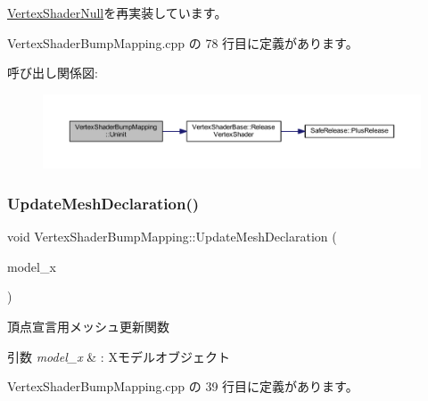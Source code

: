 \mbox{\hyperlink{class_vertex_shader_null_a16334df4ac02db3dd63f042622032301}{Vertex\+Shader\+Null}}を再実装しています。



 Vertex\+Shader\+Bump\+Mapping.\+cpp の 78 行目に定義があります。

呼び出し関係図\+:\nopagebreak
\begin{figure}[H]
\begin{center}
\leavevmode
\includegraphics[width=350pt]{class_vertex_shader_bump_mapping_abed4e0aa9655fa7a7a21e03d00e7c0e5_cgraph}
\end{center}
\end{figure}
\mbox{\label{class_vertex_shader_bump_mapping_a659d50e57533b9cd0204fc169985f1e0}} 
\subsubsection{\texorpdfstring{Update\+Mesh\+Declaration()}{UpdateMeshDeclaration()}}
{\footnotesize\ttfamily void Vertex\+Shader\+Bump\+Mapping\+::\+Update\+Mesh\+Declaration (\begin{DoxyParamCaption}\item[{\mbox{\hyperlink{class_model_x_object}{Model\+X\+Object}} $\ast$}]{model\+\_\+x }\end{DoxyParamCaption})\hspace{0.3cm}{\ttfamily [static]}}



頂点宣言用メッシュ更新関数 


\begin{DoxyParams}{引数}
{\em model\+\_\+x} & \+: Xモデルオブジェクト \\
\hline
\end{DoxyParams}


 Vertex\+Shader\+Bump\+Mapping.\+cpp の 39 行目に定義があります。

